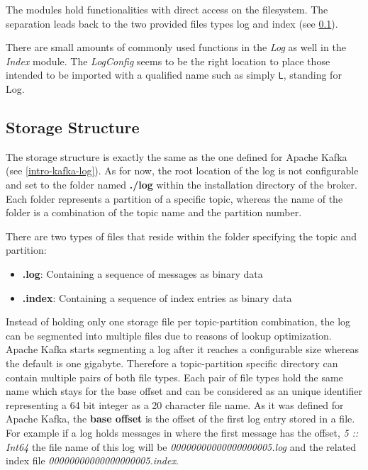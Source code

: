 The modules  hold functionalities with direct
access on the filesystem. The separation leads back to the two provided files types
log and index (see \ref{log-broker-storage}).

There are small amounts of commonly used functions in the \textit{Log} as well
in the \textit{Index} module. The \textit{LogConfig} seems to be the right
location to place those intended to be imported with a qualified name such as
simply \lstinline{L}, standing for Log.

\subsection{Storage Structure}
\label{log-broker-storage}

The storage structure is exactly the same as the one defined for Apache Kafka (see
\ref{intro-kafka-log}).  As for now, the root location of the log is not
configurable and set to the folder named \textbf{./log} within the installation
directory of the broker. Each folder represents a partition of a specific topic,
whereas the name of the folder is a combination of the topic name and the
partition number.

There are two types of files that reside within the folder specifying the
topic and partition:
\begin{itemize}
    \item {\bf .log}: Containing a sequence of messages as binary data
    \item{\bf .index}: Containing a sequence of index entries as binary data
\end{itemize}

Instead of holding only one storage file per topic-partition combination, the
log can be segmented into multiple files due to reasons of lookup optimization.
Apache Kafka starts segmenting a log after it reaches a configurable size
whereas the default is one gigabyte. Therefore a topic-partition specific
directory can contain multiple pairs of both file types. Each pair of
file types hold the same name which stays for the base offset and can be
considered as an unique identifier representing a 64 bit integer as a 20
character file name. As it was defined for Apache Kafka, the \textbf{base
offset} is the offset of the first log entry stored in a file.  For example if
a log holds messages in where the first message has the offset, \textit{5 ::
Int64} the file name of this log will be \textit{00000000000000000005.log} and
the related index file \textit{00000000000000000005.index}.

